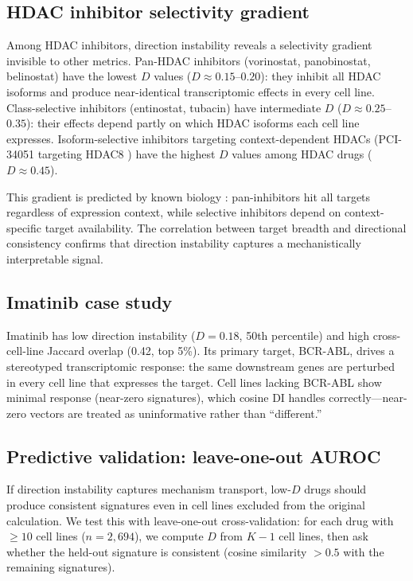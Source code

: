 \documentclass[11pt]{article}
\begin{document}
\subsection{HDAC inhibitor selectivity gradient}

Among HDAC inhibitors, direction instability reveals a selectivity
gradient invisible to other metrics. Pan-HDAC inhibitors
(vorinostat, panobinostat, belinostat) have the lowest $D$ values ($D
\approx 0.15$--$0.20$): they inhibit all HDAC isoforms and produce
near-identical transcriptomic effects in every cell line. Class-selective
inhibitors (entinostat, tubacin) have intermediate $D$ ($D \approx
0.25$--$0.35$): their effects depend partly on which HDAC isoforms each
cell line expresses. Isoform-selective inhibitors targeting
context-dependent HDACs (PCI-34051 targeting HDAC8
\citep{balasubramanian2008hdac8}) have the highest $D$ values among
HDAC drugs ($D \approx 0.45$).

This gradient is predicted by known biology \citep{bolden2006anticancer}:
pan-inhibitors hit all targets regardless of expression context, while
selective inhibitors depend on context-specific target availability. The
correlation between target breadth and directional consistency confirms
that direction instability captures a mechanistically interpretable
signal.

\subsection{Imatinib case study}

Imatinib \citep{deininger2005imatinib} has low direction instability ($D
= 0.18$, 50th percentile) and high cross-cell-line Jaccard overlap
(0.42, top 5\%). Its primary target, BCR-ABL, drives a stereotyped
transcriptomic response: the same downstream genes are perturbed in
every cell line that expresses the target. Cell lines lacking BCR-ABL
show minimal response (near-zero signatures), which cosine DI handles
correctly---near-zero vectors are treated as uninformative rather than
``different.''

\subsection{Predictive validation: leave-one-out AUROC}
\label{sec:predictive}

If direction instability captures mechanism transport, low-$D$ drugs
should produce consistent signatures even in cell lines excluded from
the original calculation. We test this with leave-one-out
cross-validation: for each drug with $\geq 10$ cell lines ($n =
2{,}694$), we compute $D$ from $K-1$ cell lines, then ask whether the
held-out signature is consistent (cosine similarity $> 0.5$ with the
remaining signatures).
\end{document}
